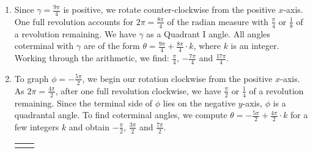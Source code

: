 \documentclass[12pt]{ximera}
\begin{document}
\begin{example}
\begin{enumerate}
\begin{center}
\begin{tabular}{cc}
\end{tabular}

\end{center}

\item Since $\gamma = \frac{9 \pi}{4}$ is positive, we rotate counter-clockwise from the positive $x$-axis.  One full revolution accounts for $2 \pi = \frac{8 \pi}{4}$ of the radian measure with $\frac{\pi}{4}$ or  $\frac{1}{8}$ of a revolution remaining.  We have $\gamma$ as a Quadrant I angle. All angles coterminal with $\gamma$ are of the form $\theta = \frac{9 \pi}{4} + \frac{8\pi}{4} \cdot k$, where $k$ is an integer.  Working through the arithmetic, we find: $\frac{\pi}{4}$, $-\frac{7 \pi}{4}$ and $\frac{17 \pi}{4}$.

\item  To graph  $\phi = -\frac{5 \pi}{2}$, we begin our rotation clockwise from the positive $x$-axis.  As  $2 \pi = \frac{4 \pi}{2}$, after one full revolution clockwise, we have  $\frac{\pi}{2}$ or $\frac{1}{4}$ of a revolution remaining.  Since the terminal side of $\phi$ lies on the negative $y$-axis, $\phi$ is a quadrantal angle.  To find coterminal angles, we compute $\theta = -\frac{5 \pi}{2} +   \frac{4 \pi}{2} \cdot k$ for a few integers $k$ and obtain $-\frac{\pi}{2}$, $\frac{3 \pi}{2}$ and $\frac{7 \pi}{2}$.

\begin{center}

\begin{tabular}{cc}

\scriptsize
\normalsize


&


\end{tabular}
\end{center}
\end{enumerate}
\end{example}
\end{document}
